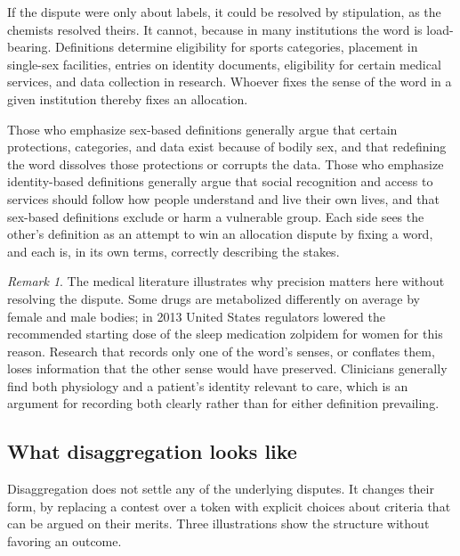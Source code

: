 \documentclass[11pt,a4paper]{article}
\theoremstyle{plain}
\theoremstyle{definition}
\theoremstyle{remark}
\newtheorem{remark}{Remark}
\begin{document}
If the dispute were only about labels, it could be resolved by stipulation, as the chemists resolved theirs. It cannot, because in many institutions the word is load-bearing. Definitions determine eligibility for sports categories, placement in single-sex facilities, entries on identity documents, eligibility for certain medical services, and data collection in research. Whoever fixes the sense of the word in a given institution thereby fixes an allocation.

Those who emphasize sex-based definitions generally argue that certain protections, categories, and data exist because of bodily sex, and that redefining the word dissolves those protections or corrupts the data. Those who emphasize identity-based definitions generally argue that social recognition and access to services should follow how people understand and live their own lives, and that sex-based definitions exclude or harm a vulnerable group. Each side sees the other's definition as an attempt to win an allocation dispute by fixing a word, and each is, in its own terms, correctly describing the stakes.

\begin{remark}
The medical literature illustrates why precision matters here without resolving the dispute. Some drugs are metabolized differently on average by female and male bodies; in 2013 United States regulators lowered the recommended starting dose of the sleep medication zolpidem for women for this reason. Research that records only one of the word's senses, or conflates them, loses information that the other sense would have preserved. Clinicians generally find both physiology and a patient's identity relevant to care, which is an argument for recording both clearly rather than for either definition prevailing.
\end{remark}

\subsection{What disaggregation looks like}

Disaggregation does not settle any of the underlying disputes. It changes their form, by replacing a contest over a token with explicit choices about criteria that can be argued on their merits. Three illustrations show the structure without favoring an outcome.
\end{document}
